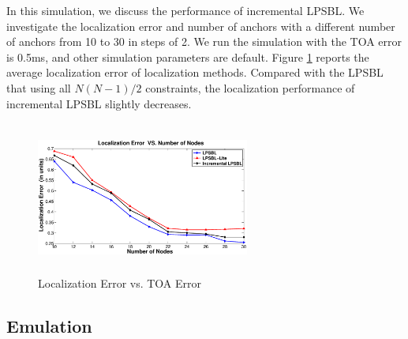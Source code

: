  In this simulation, we discuss the performance of incremental LPSBL.
We investigate the localization error and number of anchors with a different number of anchors from 10 to 30 in steps of 2. 
 We run the simulation with the TOA error is 0.5ms, and other simulation parameters are default. 
 Figure \ref{Incremental} reports the average localization error of localization methods. 
 Compared with the LPSBL that using all $N(N - 1)/2$ constraints, the localization performance of incremental LPSBL slightly decreases.
 
    \begin{figure}[htb]       
            \centering
            \includegraphics[height=5.0cm,width=7.0cm]{image/Incremental.eps}
                \caption{Localization Error vs. TOA Error}
             \vspace{-8mm}
             \label{Incremental}
        \end{figure}
		


  \subsection{Emulation}

